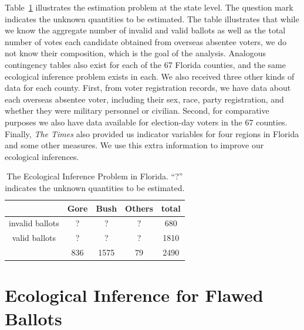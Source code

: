 \documentclass[11pt,titlepage]{article}
\begin{document}
Table~\ref{tb:ballots} illustrates the estimation problem at the state
level. The question mark indicates the unknown quantities to be
estimated.  The table illustrates that while we know the aggregate
number of invalid and valid ballots as well as the total number of
votes each candidate obtained from overseas absentee voters, we do not
know their composition, which is the goal of the analysis.  Analogous
contingency tables also exist for each of the 67 Florida counties, and
the same ecological inference problem exists in each. We also received
three other kinds of data for each county.  First, from voter
registration records, we have data about each overseas absentee voter,
including their sex, race, party registration, and whether they were
military personnel or civilian.  Second, for comparative purposes we
also have data available for election-day voters in the 67 counties.
Finally, \emph{The Times} also provided us indicator variables for
four regions in Florida and some other measures.  We use this extra
information to improve our ecological inferences.

\begin{table}[t]
  \begin{center}
    \begin{tabular}{ccccc}
      & Gore  & Bush & Others & total  \\
      \hline 
      invalid ballots &   ?   &   ?  &   ?    &  680   \\
      valid ballots   &   ?   &   ?  &   ?    & 1810   \\
      \hline
      & 836   & 1575 &   79   & 2490   \\
    \end{tabular} \caption{The Ecological Inference Problem in Florida.  
      ``?'' indicates the unknown quantities to be
      estimated.}\label{tb:ballots}
  \end{center}
\end{table} 

\section{Ecological Inference for Flawed Ballots} \label{s:ecinf}
\end{document}
